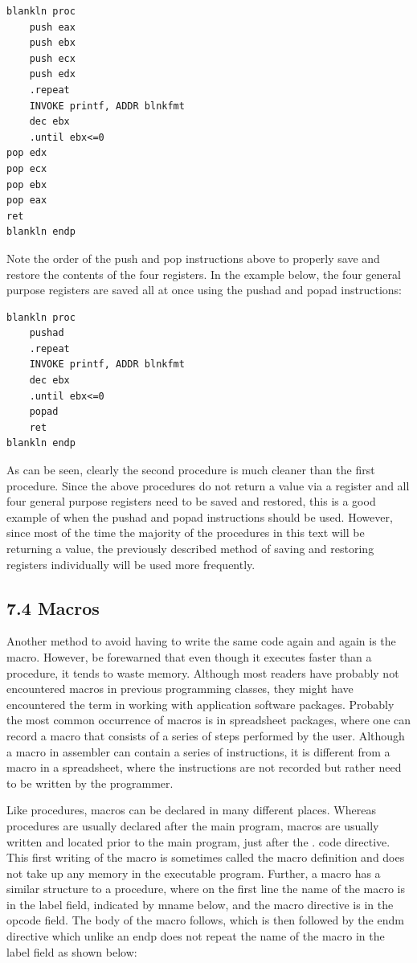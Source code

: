 \documentclass[10pt]{book}
\begin{document}
\begin{center}
\begin{center}
\begin{verbatim}
blankln proc
    push eax
    push ebx
    push ecx
    push edx
    .repeat
    INVOKE printf, ADDR blnkfmt
    dec ebx
    .until ebx<=0
pop edx
pop ecx
pop ebx
pop eax
ret
blankln endp
\end{verbatim}

Note the order of the push and pop instructions above to properly save and restore the contents of the four registers. In the example below, the four general purpose registers are saved all at once using the pushad and popad instructions:

\begin{verbatim}
blankln proc
    pushad
    .repeat
    INVOKE printf, ADDR blnkfmt
    dec ebx
    .until ebx<=0
    popad
    ret
blankln endp
\end{verbatim}

As can be seen, clearly the second procedure is much cleaner than the first procedure. Since the above procedures do not return a value via a register and all four general purpose registers need to be saved and restored, this is a good example of when the pushad and popad instructions should be used. However, since most of the time the majority of the procedures in this text will be returning a value, the previously described method of saving and restoring registers individually will be used more frequently.

\subsection*{7.4 Macros}
Another method to avoid having to write the same code again and again is the macro. However, be forewarned that even though it executes faster than a procedure, it tends to waste memory. Although most readers have probably not encountered macros in previous programming classes, they might have encountered the term in working with application software packages. Probably the most common occurrence of macros is in spreadsheet packages, where one can record a macro that consists of a series of steps performed by the user. Although a macro in assembler can contain a series of instructions, it is different from a macro in a spreadsheet, where the instructions are not recorded but rather need to be written by the programmer.

Like procedures, macros can be declared in many different places. Whereas procedures are usually declared after the main program, macros are usually written and located prior to the main program, just after the . code directive. This first writing of the macro is sometimes called the macro definition and does not take up any memory in the executable program. Further, a macro has a similar structure to a procedure, where on the first line the name of the macro is in the label field, indicated by mname below, and the macro directive is in the opcode field. The body of the macro follows, which is then followed by the endm directive which unlike an endp does not repeat the name of the macro in the label field as shown below:


\end{center}
\end{center}
\end{document}
